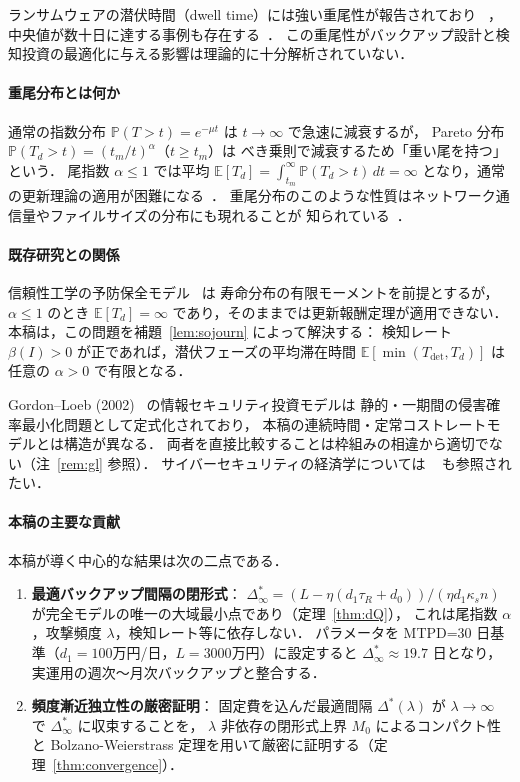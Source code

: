 \documentclass[12pt,a4paper]{article}
\theoremstyle{plain}
\theoremstyle{definition}
\theoremstyle{remark}
\newcommand{\E}{\mathbb{E}}
\newcommand{\Prob}{\mathbb{P}}
\newcommand{\Tdet}{T_{\mathrm{det}}}
\newcommand{\betaI}{\beta(I)}
\newcommand{\Dopt}{\Delta^{*}}
\newcommand{\Dinf}{\Delta^{*}_{\infty}}
\begin{document}
ランサムウェアの潜伏時間（dwell time）には強い重尾性が報告されており
~\cite{mandiant2023,ibm2023,verizon2023,sophos2023,crowdstrike2023}，
中央値が数十日に達する事例も存在する~\cite{ponemon2023}．
この重尾性がバックアップ設計と検知投資の最適化に与える影響は理論的に十分解析されていない．

\paragraph{重尾分布とは何か}
通常の指数分布 $\Prob(T>t)=e^{-\mu t}$ は $t\to\infty$ で急速に減衰するが，
Pareto 分布 $\Prob(T_d>t)=(t_m/t)^\alpha$（$t\ge t_m$）は
べき乗則で減衰するため「重い尾を持つ」という．
尾指数 $\alpha\le1$ では平均 $\E[T_d]=\int_{t_m}^\infty\Prob(T_d>t)\,dt=\infty$
となり，通常の更新理論の適用が困難になる~\cite{feller1971,embrechts1997,resnick2007}．
重尾分布のこのような性質はネットワーク通信量やファイルサイズの分布にも現れることが
知られている~\cite{mitzenmacher2004}．

\paragraph{既存研究との関係}
信頼性工学の予防保全モデル~\cite{barlow1965,nakagawa2005,aven1999} は
寿命分布の有限モーメントを前提とするが，
$\alpha\le1$ のとき $\E[T_d]=\infty$ であり，そのままでは更新報酬定理が適用できない．
本稿は，この問題を補題~\ref{lem:sojourn} によって解決する：
検知レート $\betaI>0$ が正であれば，潜伏フェーズの平均滞在時間 $\E[\min(\Tdet,T_d)]$ は
任意の $\alpha>0$ で有限となる．

Gordon--Loeb (2002)~\cite{gordon2002} の情報セキュリティ投資モデルは
静的・一期間の侵害確率最小化問題として定式化されており，
本稿の連続時間・定常コストレートモデルとは構造が異なる．
両者を直接比較することは枠組みの相違から適切でない（注~\ref{rem:gl} 参照）．
サイバーセキュリティの経済学については
~\cite{gordon2002,hausken2006,laszka2017,anderson2020,fielder2016,moore2009,bohme2010}
も参照されたい．

\paragraph{本稿の主要な貢献}
本稿が導く中心的な結果は次の二点である．
\begin{enumerate}[leftmargin=*]
\item \textbf{最適バックアップ間隔の閉形式}：
  $\Dinf=(L-\eta(d_1\tau_R+d_0))/(\eta d_1\kappa_s n)$
  が完全モデルの唯一の大域最小点であり（定理~\ref{thm:dQ}），
  これは尾指数 $\alpha$，攻撃頻度 $\lambda$，検知レート等に依存しない．
  パラメータを MTPD=30 日基準（$d_1=100$万円/日，$L=3000$万円）に設定すると
  $\Dinf\approx19.7$ 日となり，実運用の週次〜月次バックアップと整合する．
\item \textbf{頻度漸近独立性の厳密証明}：
  固定費を込んだ最適間隔 $\Dopt(\lambda)$ が
  $\lambda\to\infty$ で $\Dinf$ に収束することを，
  $\lambda$ 非依存の閉形式上界 $M_0$ によるコンパクト性と
  Bolzano-Weierstrass 定理を用いて厳密に証明する（定理~\ref{thm:convergence}）．
\end{enumerate}
\end{document}
